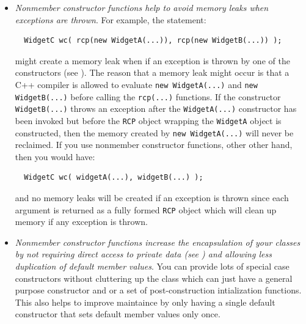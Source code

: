 \documentclass[pdf,ps2pdf,11pt]{SANDreport}
\begin{document}
\begin{itemize}
{}\item\textit{Nonmember constructor functions help to avoid memory leaks when
exceptions are thrown}.  For example, the statement:

{\small\begin{verbatim}
  WidgetC wc( rcp(new WidgetA(...)), rcp(new WidgetB(...)) );
\end{verbatim}}

might create a memory leak when if an exception is thrown by one of the
constructors (see {}\cite[Item 13]{C++CodingStandards05}).  The reason that a
memory leak might occur is that a C++ compiler is allowed to evaluate
{}\texttt{new WidgetA(...)} and {}\texttt{new WidgetB(...)} before calling the
{}\texttt{rcp(...)} functions.  If the constructor {}\texttt{WidgetB(...)} 
throws an exception after the {}\texttt{WidgetA(...)} constructor has been
invoked but before the {}\texttt{RCP} object wrapping the {}\texttt{WidgetA}
object is constructed, then the memory created by {}\texttt{new WidgetA(...)} 
will never be reclaimed.  If you use nonmember constructor functions, other
other hand, then you would have:

{\small\begin{verbatim}
  WidgetC wc( widgetA(...), widgetB(...) );
\end{verbatim}}

and no memory leaks will be created if an exception is thrown since each
argument is returned as a fully formed {}\texttt{RCP} object which will clean
up memory if any exception is thrown.

{}\item\textit{Nonmember constructor functions increase the encapsulation of
your classes by not requiring direct access to private data (see {}\cite[Item
44]{C++CodingStandards05}) and allowing less duplication of default member
values}.  You can provide lots of special case constructors without cluttering
up the class which can just have a general purpose constructor and or a set of
post-construction intialization functions.  This also helps to improve
maintaince by only having a single default constructor that sets default
member values only once.



\end{itemize}
\end{document}
